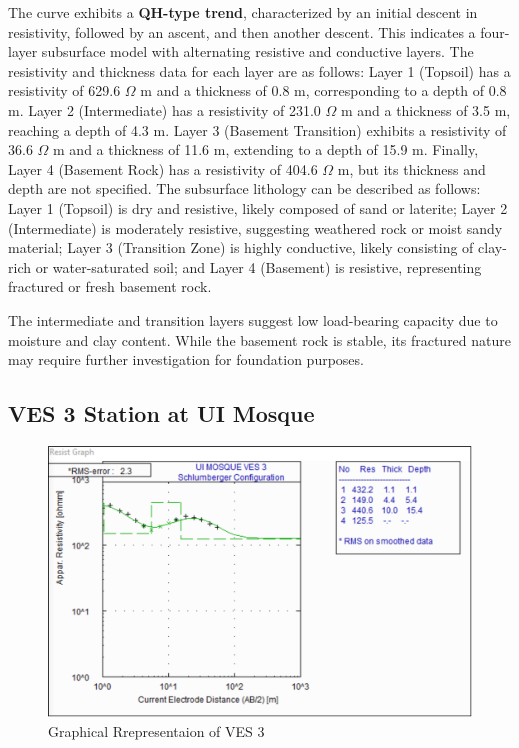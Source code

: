 \documentclass[12pt,a4paper]{report}
\begin{document}
The curve exhibits a \textbf{QH-type trend}, characterized by an initial descent in resistivity, followed by an ascent, and then another descent. This indicates a four-layer subsurface model with alternating resistive and conductive layers. The resistivity and thickness data for each layer are as follows: Layer 1 (Topsoil) has a resistivity of 629.6 $\Omega$ m and a thickness of 0.8 m, corresponding to a depth of 0.8 m. Layer 2 (Intermediate) has a resistivity of 231.0 $\Omega$ m and a thickness of 3.5 m, reaching a depth of 4.3 m. Layer 3 (Basement Transition) exhibits a resistivity of 36.6 $\Omega$ m and a thickness of 11.6 m, extending to a depth of 15.9 m. Finally, Layer 4 (Basement Rock) has a resistivity of 404.6 $\Omega$ m, but its thickness and depth are not specified. The subsurface lithology can be described as follows: Layer 1 (Topsoil) is dry and resistive, likely composed of sand or laterite; Layer 2 (Intermediate) is moderately resistive, suggesting weathered rock or moist sandy material; Layer 3 (Transition Zone) is highly conductive, likely consisting of clay-rich or water-saturated soil; and Layer 4 (Basement) is resistive, representing fractured or fresh basement rock.

The intermediate and transition layers suggest low load-bearing capacity due to moisture and clay content. While the basement rock is stable, its fractured nature may require further investigation for foundation purposes.

\subsection{VES 3 Station at UI Mosque}

\begin{figure}[H]
    \centering
    \includegraphics[width=1.0\textwidth]{ui_ves3.png}
    \caption{Graphical Rrepresentaion of VES 3}
    \label{fig:VES_3_Curve}
\end{figure}
\end{document}
